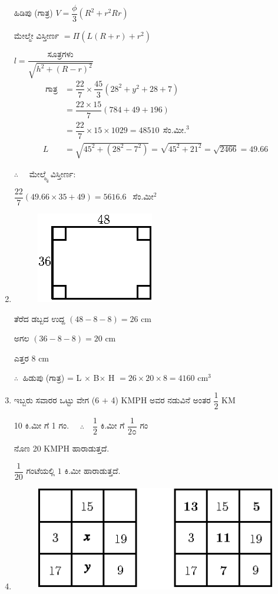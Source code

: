 \begin{enumerate}
ಹಿಡಿಪು (ಗಾತ್ರ) $V = \dfrac{\phi}{3} (R^{2} + r^{2}  Rr)$

ಮೇಲ್ಮೇ ವಿಸ್ತೀರ್ಣ $= \Pi (L(R + r) + r^{2})$

${l = \dfrac{{\text{ ಸೂತ್ರಗಳು }}}{\sqrt{h^{2} + (R - r)^{2}}}}$
\begin{align*}
\text{ ಗಾತ್ರ} & = \dfrac{22}{7} \times \dfrac{45}{3} (28^{2} + y^{2} + 28 + 7)\\
& = \dfrac{22\times 15}{7} (784 + 49 + 196)\\
& = \dfrac{22}{7} \times 15\times 1029 = 48510 ~~\text{ಸೆಂ.ಮೀ.}^{3}\\
L & = \sqrt{45^{2} + (28^{2} - 7^{2})} = \sqrt{45^{2} + 21^{2}} = \sqrt{2466} = 49.66
\end{align*}

$\therefore\quad$ ಮೇಲ್ಮ್ಯೆ  ವಿಸ್ತೀರ್ಣ: 

$\dfrac{22}{7} (49.66\times 35 + 49) = 5616.6~~$ ಸೆಂ.ಮೀ$^{2}$

\item
\begin{figure}[H]
\centering
\includegraphics{images/chap10/ans24.eps}
\end{figure} 

ತೆರೆದ ಡಬ್ಬದ ಉದ್ದ $(48 - 8 - 8) = 26$ cm

ಅಗಲ $(36 - 8 - 8) = 20$ cm

ಎತ್ತರ $8$ cm

$\therefore~$ ಹಿಡುಪು (ಗಾತ್ರ) = L $\times$  B$\times$ H $= 26\times 20\times 8 = 4160$ cm$^{3}$

\item  ಇಬ್ಬರು ಸವಾರರ ಒಟ್ಟು ವೇಗ (6 $+$ 4) KMPH ಅವರ ನಡುವಿನೆ ಅಂತರ $\dfrac{1}{2}$ KM

10 ಕಿ.ಮೀ ಗೆ  1 ಗಂ. $\quad\therefore\quad \dfrac{1}{2}$ ಕಿ.ಮೀ ಗೆ $\dfrac{1}{2೦}$ ಗಂ 

ನೊಣ 20 KMPH ಹಾರಾಡುತ್ತದೆ. 

$\dfrac{1}{20}$ ಗಂಟೆಯಲ್ಲಿ $1$ ಕಿ.ಮೀ ಹಾರಾಡುತ್ತದೆ. 

\item 
\begin{figure}[H]
\centering
\includegraphics{images/chap10/ans26.eps}
\end{figure} 


\end{enumerate}

